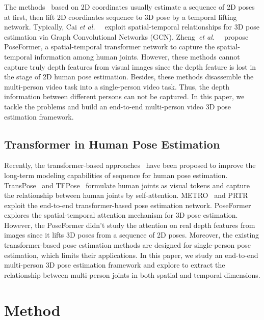 \documentclass[sigconf]{acmart}
\newcommand{\etal}{\textit{et al.~}}
\begin{document}
The methods~\cite{arnab2019exploiting,cai2019exploiting,zheng20213d} based on 2D coordinates usually estimate a sequence of 2D poses at first, then lift 2D coordinates sequence to 3D pose by a temporal lifting network. Typically, Cai \etal~\cite{cai2019exploiting} exploit spatial-temporal relationships for 3D pose estimation via Graph Convolutional Networks (GCN). Zheng~\etal~\cite{zheng20213d} propose PoseFormer, a spatial-temporal transformer network to capture the spatial-temporal information among human joints. However, these methods cannot capture truly depth features from visual images since the depth feature is lost in the stage of 2D human pose estimation. Besides, these methods disassemble the multi-person video task into a single-person video task. Thus, the depth information between different persons can not be captured. In this paper, we tackle the problems and build an end-to-end multi-person video 3D pose estimation framework.

\subsection{Transformer in Human Pose Estimation}
Recently, the transformer-based approaches~\cite{yang2021transpose,li2021pose,mao2021tfpose,lin2021end,zheng20213d,huang2021unifying} have been proposed to improve the long-term modeling capabilities of sequence for human pose estimation. TransPose~\cite{yang2021transpose} and TFPose~\cite{mao2021tfpose} formulate human joints as visual tokens and capture the relationship between human joints by self-attention. METRO~\cite{li2021pose} and PRTR~\cite{li2021pose} exploit the end-to-end transformer-based pose estimation network. PoseFormer~\cite{zheng20213d} explores the spatial-temporal attention mechanism for 3D pose estimation. However, the PoseFormer didn't study the attention on real depth features from images since it lifts 3D poses from a sequence of 2D poses. Moreover, the existing transformer-based pose estimation methods are designed for single-person pose estimation, which limits their applications. In this paper, we study an end-to-end multi-person 3D pose estimation framework and explore to extract the relationship between multi-person joints in both spatial and temporal dimensions.

\section{Method}
\end{document}
